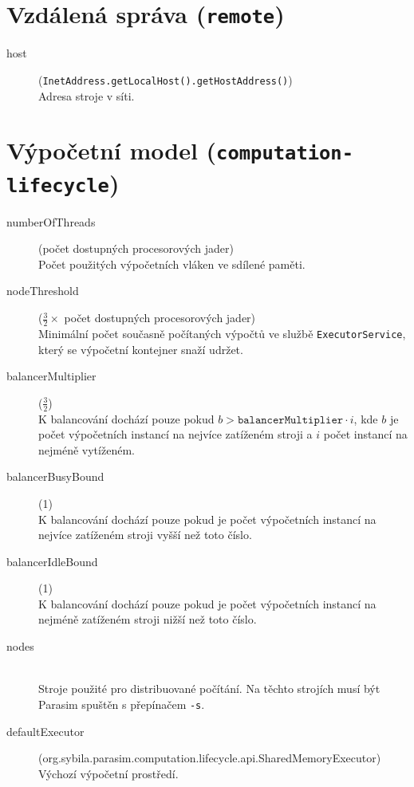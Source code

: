\section{Vzdálená správa (\texttt{remote})}

\begin{description}
	\item[host] (\texttt{InetAddress.getLocalHost().getHostAddress()}) \\
		Adresa stroje v síti.
\end{description}

\section{Výpočetní model (\texttt{computation-lifecycle})}

\begin{description}
	\item[numberOfThreads] (počet dostupných procesorových jader) \\
		Počet použitých výpočetních vláken ve sdílené paměti.
	\item[nodeThreshold] ($\frac{3}{2} \times $ počet dostupných procesorových jader) \\
		Minimální počet současně počítaných výpočtů ve službě \texttt{ExecutorService}, který se výpočetní kontejner snaží udržet.
	\item[balancerMultiplier] ($\frac{3}{2}$) \\
		K balancování dochází pouze pokud $b > \texttt{balancerMultiplier} \cdot i$, kde $b$ je počet výpočetních instancí na nejvíce zatíženém stroji a $i$ počet instancí na nejméně vytíženém.
	\item[balancerBusyBound] (1) \\
		K balancování dochází pouze pokud je počet výpočetních instancí na nejvíce zatíženém stroji vyšší než toto číslo.
	\item[balancerIdleBound] (1) \\
		K balancování dochází pouze pokud je počet výpočetních instancí na nejméně zatíženém stroji nižší než toto číslo.
	\item[nodes] ~\\
		Stroje použité pro distribuované počítání. Na těchto strojích musí být Parasim spuštěn s přepínačem \texttt{-s}.
	\item[defaultExecutor] (org.sybila.parasim.computation.lifecycle.api.SharedMemoryExecutor) \\
		Výchozí výpočetní prostředí.
\end{description}

